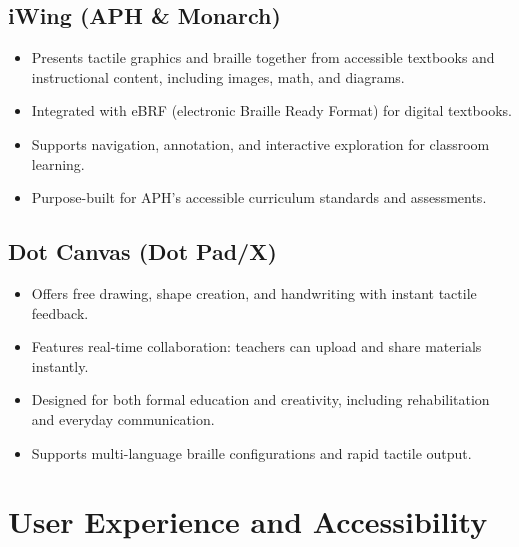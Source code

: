 \subsection{iWing (APH \& Monarch)}
\begin{itemize}
	\item Presents tactile graphics and braille together from accessible textbooks and instructional content, including images, math, and diagrams\supercite{paths_monarch}.
	\item Integrated with eBRF (electronic Braille Ready Format) for digital textbooks\supercite{nelowvision_monarch}.
	\item Supports navigation, annotation, and interactive exploration for classroom learning.
	\item Purpose-built for APH's accessible curriculum standards and assessments\supercite{ed_gov_aph}.
\end{itemize}

\subsection{Dot Canvas (Dot Pad/X)}
\begin{itemize}
	\item Offers free drawing, shape creation, and handwriting with instant tactile feedback\supercite{dot_appstore}.
	\item Features real-time collaboration: teachers can upload and share materials instantly.
	\item Designed for both formal education and creativity, including rehabilitation and everyday communication\supercite{ces_dotcanvas}.
	\item Supports multi-language braille configurations and rapid tactile output\supercite{visionaid_dotpad}.
\end{itemize}

\section{User Experience and Accessibility}

